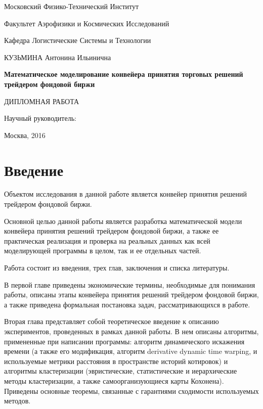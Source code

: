 \documentclass[12pt]{article}
\begin{document}
\thispagestyle{empty}
\begin{center}
\small{Московский Физико-Технический Институт

Факультет Аэрофизики и Космических Исследований

Кафедра Логистические Системы и Технологии}

\parskip=80pt
КУЗЬМИНА Антонина Ильинична
\parskip=30pt

\textbf{\large{Математическое моделирование конвейера принятия торговых решений трейдером фондовой биржи}}

ДИПЛОМНАЯ РАБОТА
\end{center}

\begin{flushright}
\parskip=50pt
Научный руководитель:
\end{flushright}

\vspace{\fill}
\begin{center}
Москва, 2016
\end{center}
\newpage{}
\tableofcontents{}
\newpage{}
\renewcommand\thesection{}
\renewcommand\thesubsection{}
\renewcommand\thesubsubsection{}
\section{Введение}
Объектом исследования в данной работе является конвейер принятия решений трейдером фондовой биржи.

Основной целью данной работы является разработка математической модели конвейера принятия решений трейдером фондовой биржи, а также ее практическая реализация и проверка на реальных данных как всей моделирующей программы в целом, так и ее отдельных частей.

Работа состоит из введения, трех глав, заключения и списка литературы.

В первой главе приведены экономические термины, необходимые для понимания работы, описаны этапы конвейера принятия решений трейдером фондовой биржи, а также приведена формальная постановка задач, рассматривающихся в работе.

Вторая глава представляет собой теоретическое введение к описанию экспериментов, проведенных в рамках данной работы. В нем описаны алгоритмы, примененные при написании программы: алгоритм динамического искажения времени (а также его модификация, алгоритм derivative dynamic time warping, и используемые метрики расстояния в пространстве историй котировок) и алгоритмы кластеризации (эвристические, статистические и иерархические методы кластеризации, а также самоорганизующиеся карты Кохонена). Приведены основные теоремы, связанные с гарантиями сходимости используемых методов.
\end{document}
